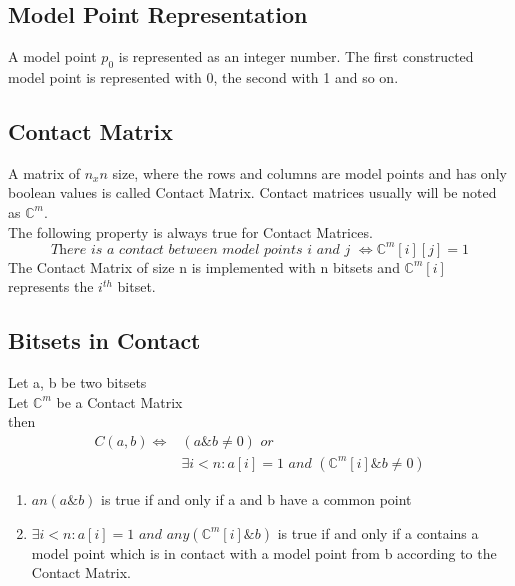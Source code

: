 \documentclass{article}
\begin{document}
	\subsection{Model Point Representation}
		A model point $p_0$ is represented as an integer number. The first constructed model point is represented with 0, the second with 1 and so on.

	\subsection{Contact Matrix}
	\label{sec:contact-matrix}
		A matrix of $n_x n$ size, where the rows and columns are model points and has only boolean values is called Contact Matrix.
		Contact matrices usually will be noted as $\mathbb{C}^m$. \\
		The following property is always true for Contact Matrices. \\ 
		\begin{equation}
			\textit{There is a contact between model points i and j } \iff \mathbb{C}^m[i][j] = 1
		\end{equation}
		The Contact Matrix of size n is implemented with n bitsets and $\mathbb{C}^m[i]$ represents the $i^{th}$ bitset.

	\subsection{Bitsets in Contact}
	Let a, b be two bitsets \\
	Let $\mathbb{C}^m$ be a Contact Matrix\\
	then
	\begin{align*}
		C(a, b) \iff & (a \& b \neq 0) \textit{ or } \\
		&\exists i < n : a[i]=1 \textit{ and } (\mathbb{C}^m[i] \& b \neq 0)
	\end{align*}

	\begin{enumerate}
		\item $an(a \& b)$ is true if and only if a and b have a common point
		\item $\exists i < n : a[i]=1 \textit{ and } any(\mathbb{C}^m[i] \& b)$ is true if and only if a contains a model point which is 
			in contact with a model point from b according to the Contact Matrix.
	\end{enumerate}
			
\end{document}

